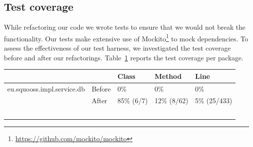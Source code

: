 \documentclass{article}
\begin{document}
\subsection{Test coverage}
While refactoring our code we wrote tests to ensure that we would not break the functionality. Our tests make extensive use of Mockito\footnote{\url{https://github.com/mockito/mockito}} to mock dependencies. To assess the effectiveness of our test harness, we investigated the test coverage before and after our refactorings. Table~\ref{tbl:coverage} reports the test coverage per package.

\begin{table}
    \begin{tabular}{ll|lll}
    ~                          & ~      & Class      & Method      & Line         \\ \hline
    eu.squooss.impl.service.db & Before & 0\%        & 0\%         & 0\%          \\
    ~                          & After  & 85\% (6/7) & 12\% (8/62) & 5\% (25/433) \\ \hline
    ~                          & ~      & ~          & ~           & ~            \\
    \end{tabular}
    \label{tbl:coverage}
\end{table}



\end{document}
